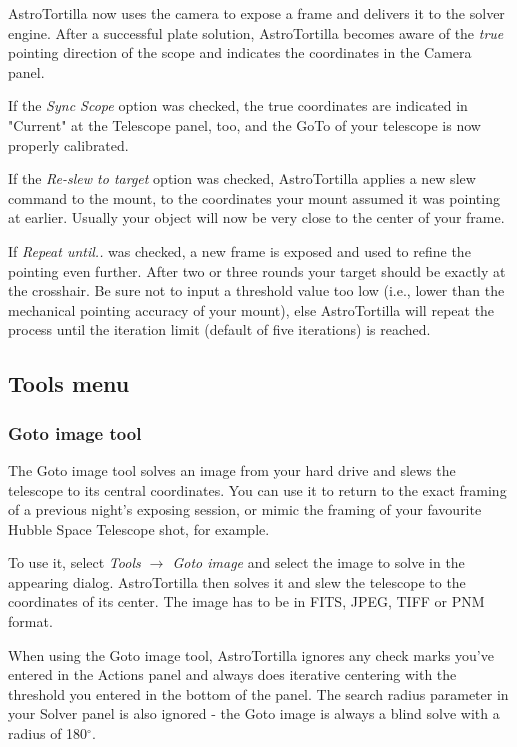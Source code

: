 \documentclass[english]{article}
\begin{document}
AstroTortilla now uses the camera to expose a frame and delivers it to the solver engine. 
After a successful plate solution, AstroTortilla becomes aware of the \emph{true} 
pointing direction of the scope and indicates the coordinates in the Camera panel.

If the \emph{Sync Scope} option was checked, the true coordinates are indicated
in "Current" at the Telescope panel, too, and the GoTo of your telescope is now
properly calibrated.

If the \emph{Re-slew to target} option was checked, AstroTortilla applies a new
slew command to the mount, to the coordinates your mount assumed it was
pointing at earlier. Usually your object will now be very close to the center
of your frame.

If \emph{Repeat until..} was checked, a new frame is exposed and used to refine the pointing 
even further. After two or three rounds your target should be exactly at the crosshair.
Be sure not to input a threshold value too low (i.e., lower than the mechanical pointing accuracy of your mount),
else AstroTortilla will repeat the process until the iteration limit (default of five iterations) is reached.

\subsection{Tools menu}
\subsubsection{Goto image tool}

The Goto image tool solves an image from your hard drive and slews the
telescope to its central coordinates. You can use it to return to the exact
framing of a previous night's exposing session, or mimic the framing of your
favourite Hubble Space Telescope shot, for example.

To use it, select \emph{Tools $\rightarrow$ Goto image} and select the image to
solve in the appearing dialog.  AstroTortilla then solves it and slew the
telescope to the coordinates of its center. The image has to be in FITS, JPEG,
TIFF or PNM format.

When using the Goto image tool, AstroTortilla ignores any check marks you've
entered in the Actions panel and always does iterative centering with the
threshold you entered in the bottom of the panel. The search radius parameter in
your Solver panel is also ignored - the Goto image is always a blind solve with a radius of 180$^\circ$.
\end{document}
